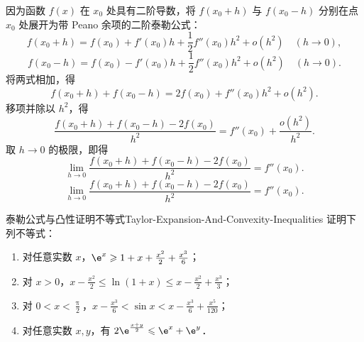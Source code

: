\begin{solution}
    因为函数 $f(x)$ 在 $x_0$ 处具有二阶导数，将 $f(x_0 + h)$ 与 $f(x_0 - h)$ 分别在点 $x_0$ 处展开为带 Peano 余项的二阶泰勒公式：
    \begin{equation}
        f(x_0 + h) = f(x_0) + f'(x_0)h + \frac{1}{2}f''(x_0)h^2 + o(h^2) \quad (h \to 0),
    \end{equation}
    \begin{equation}
        f(x_0 - h) = f(x_0) - f'(x_0)h + \frac{1}{2}f''(x_0)h^2 + o(h^2) \quad (h \to 0).
    \end{equation}
    将两式相加，得
    \begin{equation}
        f(x_0 + h) + f(x_0 - h) = 2f(x_0) + f''(x_0)h^2 + o(h^2).
    \end{equation}
    移项并除以 $h^2$，得
    \begin{equation}
        \frac{f(x_0 + h) + f(x_0 - h) - 2f(x_0)}{h^2} = f''(x_0) + \frac{o(h^2)}{h^2}.
    \end{equation}
    取 $h \to 0$ 的极限，即得
    \begin{equation}
        \lim_{h\to 0} \frac{f(x_0 + h) + f(x_0 - h) - 2f(x_0)}{h^2} = f''(x_0).
    \end{equation}
    \begin{equation}
        \boxed{\lim_{h\to 0} \frac{f(x_0 + h) + f(x_0 - h) - 2f(x_0)}{h^2} = f''(x_0).}
    \end{equation}
\end{solution}

\begin{problem}{泰勒公式与凸性证明不等式}{Taylor-Expansion-And-Convexity-Inequalities}
    证明下列不等式：
    \begin{enumerate}
        \item 对任意实数 $x$，$\e^x \geqslant 1 + x + \frac{x^2}{2} + \frac{x^3}{6}$；
        \item 对 $x > 0$，$x - \frac{x^2}{2} \leqslant \ln(1 + x) \leqslant x - \frac{x^2}{2} + \frac{x^3}{3}$；
        \item 对 $0 < x < \frac{\uppi}{2}$，$x - \frac{x^3}{6} < \sin x < x - \frac{x^3}{6} + \frac{x^5}{120}$；
        \item 对任意实数 $x, y$，有 $2\e^{\frac{x+y}{2}} \leqslant \e^x + \e^y$．
    \end{enumerate}
\end{problem}

